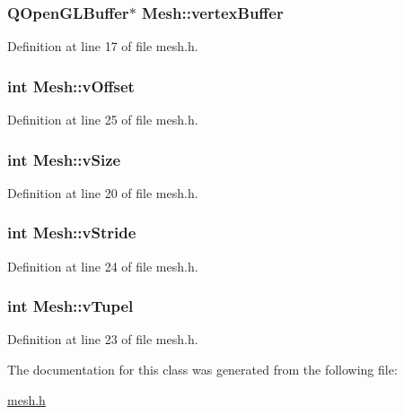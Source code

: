 \subsubsection[{vertex\+Buffer}]{\setlength{\rightskip}{0pt plus 5cm}Q\+Open\+G\+L\+Buffer$\ast$ Mesh\+::vertex\+Buffer\hspace{0.3cm}{\ttfamily [protected]}}\label{class_mesh_ae53507ed0f2756e37a55e57a169cbec0}


Definition at line 17 of file mesh.\+h.

\hypertarget{class_mesh_a251ab9a090efb842f2b5e2674d31e112}{}
\subsubsection[{v\+Offset}]{\setlength{\rightskip}{0pt plus 5cm}int Mesh\+::v\+Offset\hspace{0.3cm}{\ttfamily [protected]}}\label{class_mesh_a251ab9a090efb842f2b5e2674d31e112}


Definition at line 25 of file mesh.\+h.

\hypertarget{class_mesh_a840028792aecdad5f9b649222329d521}{}
\subsubsection[{v\+Size}]{\setlength{\rightskip}{0pt plus 5cm}int Mesh\+::v\+Size\hspace{0.3cm}{\ttfamily [protected]}}\label{class_mesh_a840028792aecdad5f9b649222329d521}


Definition at line 20 of file mesh.\+h.

\hypertarget{class_mesh_a5e054aa2a4f8e2af8f1f5342ef847f26}{}
\subsubsection[{v\+Stride}]{\setlength{\rightskip}{0pt plus 5cm}int Mesh\+::v\+Stride\hspace{0.3cm}{\ttfamily [protected]}}\label{class_mesh_a5e054aa2a4f8e2af8f1f5342ef847f26}


Definition at line 24 of file mesh.\+h.

\hypertarget{class_mesh_a07d24d28a6cf55b5575e0525dd9ecceb}{}
\subsubsection[{v\+Tupel}]{\setlength{\rightskip}{0pt plus 5cm}int Mesh\+::v\+Tupel\hspace{0.3cm}{\ttfamily [protected]}}\label{class_mesh_a07d24d28a6cf55b5575e0525dd9ecceb}


Definition at line 23 of file mesh.\+h.



The documentation for this class was generated from the following file\+:\begin{DoxyCompactItemize}
\item 
\hyperlink{mesh_8h}{mesh.\+h}\end{DoxyCompactItemize}
